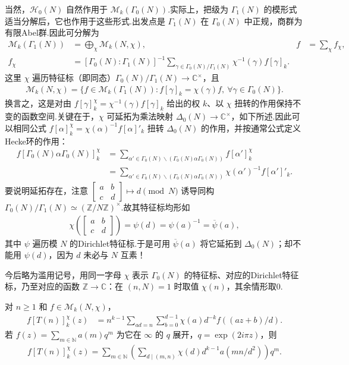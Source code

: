 当然，$\mathcal H_0(N)$ 自然作用于 $\mathcal M_k(\Gamma_0(N))$.实际上，把级为 $\Gamma_1(N)$ 的模形式适当分解后，它也作用于这些形式.出发点是 $\Gamma_1(N)$ 在 $\Gamma_0(N)$ 中正规，商群为有限Abel群.因此可分解为
\begin{align*}
\mathcal M_k(\Gamma_1(N))&=\bigoplus_\chi\mathcal M_k(N,\chi),&f&=\sum_\chi f_\chi,\\
f_\chi&=[\Gamma_0(N):\Gamma_1(N)]^{-1}\sum_{\gamma\in\Gamma_0(N)/\Gamma_1(N)}\chi^{-1}(\gamma)f[\gamma]_k.
\end{align*}
这里 $\chi$ 遍历特征标（即同态）$\Gamma_0(N)/\Gamma_1(N)\to\mathbb C^\times$，且
\begin{align*}
\mathcal M_k(N,\chi)=\{f\in\mathcal M_k(\Gamma_1(N)):f[\gamma]_k=\chi(\gamma)f,\ \forall\gamma\in\Gamma_0(N)\}.
\end{align*}
换言之，这是对由 $f[\gamma]_k^\chi=\chi^{-1}(\gamma)f[\gamma]_k$ 给出的权 $k$、以 $\chi$ 扭转的作用保持不变的函数空间.关键在于，$\chi$ 可延拓为乘法映射 $\Delta_0(N)\to\mathbb C^\times$，如下所述.因此可以相同公式 $f[\alpha]_k^\chi=\chi(\alpha)^{-1}f[\alpha]'_k$ 扭转 $\Delta_0(N)$ 的作用，并按通常公式定义Hecke环的作用：
\begin{align*}
f[\Gamma_0(N)\alpha\Gamma_0(N)]_k^\chi
&=\sum_{\alpha'\in\Gamma_0(N)\backslash(\Gamma_0(N)\alpha\Gamma_0(N))}f[\alpha']_k^\chi\\
&=\sum_{\alpha'\in\Gamma_0(N)\backslash(\Gamma_0(N)\alpha\Gamma_0(N))}\chi(\alpha')^{-1}f[\alpha']'_k.
\end{align*}
要说明延拓存在，注意 $\left[\begin{smallmatrix}a&b\\c&d\end{smallmatrix}\right]\mapsto d\pmod N$ 诱导同构 $\Gamma_0(N)/\Gamma_1(N)\simeq(\mathbb Z/N\mathbb Z)^\times$.故其特征标均形如
\begin{align*}
\chi\left(\begin{bmatrix}a&b\\c&d\end{bmatrix}\right)=\psi(d)=\psi(a)^{-1}=\overline\psi(a),
\end{align*}
其中 $\psi$ 遍历模 $N$ 的Dirichlet特征标.于是可用 $\overline\psi(a)$ 将它延拓到 $\Delta_0(N)$；却不能用 $\psi(d)$，因为 $d$ 未必与 $N$ 互素！

今后略为滥用记号，用同一字母 $\chi$ 表示 $\Gamma_0(N)$ 的特征标、对应的Dirichlet特征标，乃至对应的函数 $\mathbb Z\to\mathbb C$：在 $(n,N)=1$ 时取值 $\chi(n)$，其余情形取0.

\begin{lemma*}

对 $n\ge1$ 和 $f\in\mathcal M_k(N,\chi)$，
\begin{align*}
f[T(n)]_k^\chi(z)&=n^{k-1}\sum_{ad=n}\sum_{b=0}^{d-1}\chi(a)d^{-k}f((az+b)/d).
\end{align*}
若 $f(z)=\sum_{m\in\mathbb N}a(m)q^m$ 为它在 $\infty$ 的 $q$ 展开，$q=\exp(2i\pi z)$，则
\begin{align*}
f[T(n)]_k^\chi(z)=\sum_{m\in\mathbb N}\left(\sum_{d\mid(m,n)}\chi(d)d^{k-1}a(mn/d^2)\right)q^m.
\end{align*}
\end{lemma*}

